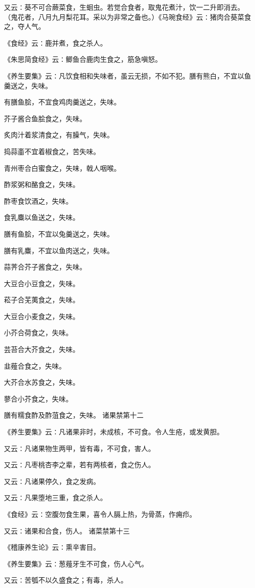 \documentclass[a4paper,12pt,UTF8,twoside]{ctexbook}
\begin{document}
又云∶葵不可合蕨菜食，生蛔虫。若觉合食者，取鬼花煮汁，饮一二升即消去。（鬼花者，八月九月梨花耳。采以为非常之备也。）《马琬食经》云∶猪肉合葵菜食之，夺人气。

《食经》云∶鹿并煮，食之杀人。

《朱思简食经》云∶鲫鱼合鹿肉生食之，筋急嗔怒。

《养生要集》云∶凡饮食相和失味者，虽云无损，不如不犯。膳有熊白，不宜以鱼羹送之，失味。

有膳鱼脍，不宜食鸡肉羹送之，失味。

芥子酱合鱼脍食之，失味。

炙肉汁着浆清食之，有臊气，失味。

捣蒜齑不宜着椒食之，苦失味。

青州枣合白蜜食之，失味，戟人咽喉。

酢浆粥和酪食之，失味。

酢枣食饮酒之，失味。

食乳麋以鱼送之，失味。

膳有鱼脍，不宜以兔羹送之，失味。

膳有乳麋，不宜以鱼肉送之，失味。

蒜荠合芥子酱食之，失味。

大豆合小豆食之，失味。

菘子合芜荑食之，失味。

大豆合小麦食之，失味。

小芥合荷食之，失味。

芸苔合大芥食之，失味。

韭薤合食之，失味。

大芥合水苏食之，失味。

蓼合小芥食之，失味。

膳有糯食酢及酢菹食之，失味。
诸果禁第十二

《养生要集》云∶凡诸果非时，未成核，不可食。令人生疮，或发黄胆。

又云∶凡诸果物生两甲，皆有毒，不可食，害人。

又云∶凡枣桃杏李之辈，若有两核者，食之伤人。

又云∶凡诸果停久，食之发病。

又云∶凡果堕地三重，食之杀人。

《食经》云∶空腹勿食生果，喜令人膈上热，为骨蒸，作痈疖。

又云∶诸果和合食，伤人。
诸菜禁第十三

《稽康养生论》云∶熏辛害目。

《养生要集》云∶葱薤牙生不可食，伤人心气。

又云∶苦瓠不以久盛食之；有毒，杀人。
\end{document}
